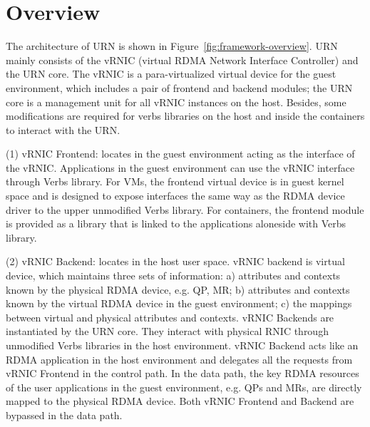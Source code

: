 \section{Overview}
The architecture of URN is shown in Figure~\ref{fig:framework-overview}. URN mainly consists of the vRNIC (virtual RDMA Network Interface Controller) and the URN core. The vRNIC is a para-virtualized virtual device for the guest environment, which includes a pair of frontend and backend modules; the URN core is a management unit for all vRNIC instances on the host. Besides, some modifications are required for  verbs libraries on the host and inside the containers to interact with the URN.

(1) vRNIC Frontend: locates in the guest environment acting as the interface of the vRNIC. Applications in the guest environment can use the vRNIC interface through Verbs library. For VMs, the frontend virtual device is in guest kernel space and is designed to expose interfaces the same way as the RDMA device driver to the upper unmodified Verbs library. For containers, the frontend module is provided as a library that is linked to the applications aloneside with Verbs library.

(2) vRNIC Backend: locates in the host user space. vRNIC backend is virtual device, which maintains three sets of information: a) attributes and contexts known by the physical RDMA device, e.g. QP, MR; b) attributes and contexts known by the virtual RDMA device in the guest environment; c) the mappings between virtual and physical attributes and contexts. vRNIC Backends are instantiated by the URN core. They interact with physical RNIC through unmodified Verbs libraries in the host environment. vRNIC Backend acts like an RDMA application in the host environment and delegates all the requests from vRNIC Frontend in the control path. In the data path, the key RDMA resources of the user applications in the guest environment, e.g. QPs and MRs, are directly mapped to the physical RDMA device. Both vRNIC Frontend and Backend are bypassed in the data path.

